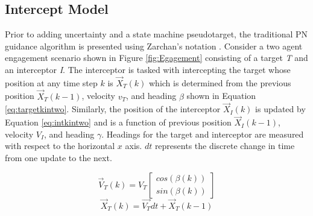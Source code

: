 \documentclass[]{aiaa-tc}%
\begin{document}



\subsection{Intercept Model}
Prior to adding uncertainty and a state machine pseudotarget, the traditional PN guidance algorithm is presented using Zarchan's notation \cite{zarchan}. Consider a two agent engagement scenario shown in Figure \ref{fig:Egagement} consisting of a target \textit{T} and an interceptor \textit{I}. The interceptor is tasked with intercepting the target whose position at any time step $k$ is $\overrightarrow{X}_T(k)$ which is determined from the previous position $\overrightarrow{X}_T(k-1)$, velocity $v_T$, and heading $\beta$ shown in Equation \ref{eq:targetkintwo}. Similarly, the position of the interceptor $\overrightarrow{X}_I(k)$ is updated by Equation \ref{eq:intkintwo} and is a function of previous position $\overrightarrow{X}_I(k-1)$, velocity $V_I$, and heading $\gamma$. Headings for the target and interceptor are measured with respect to the horizontal $x$ axis. $dt$ represents the discrete change in time from one update to the next.



\begin{equation}\label{eq:targetkin}
\overrightarrow{V}_{T}(k) =  V_{T} \begin{bmatrix} cos(\beta(k)) \\ sin(\beta(k)) \end{bmatrix}
\end{equation}
\begin{equation}\label{eq:targetkintwo}
\overrightarrow{X}_T(k) =  \overrightarrow{V_T}dt + \overrightarrow{X}_T(k-1) 
\end{equation}
\end{document}

